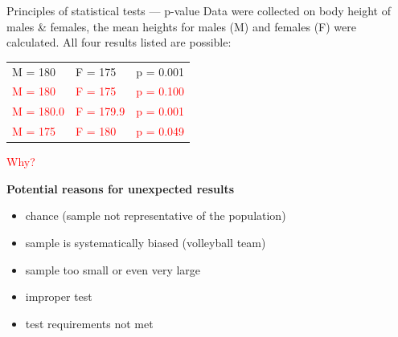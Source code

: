 \documentclass[
  ignorenonframetext,
  aspectratio=169,
  t]{beamer}
\providecommand{\tightlist}{%
  \setlength{\itemsep}{0pt}\setlength{\parskip}{0pt}}
\newcommand{\bluebold}[1]{\textcolor{bluebeamer}{\textbf{#1}}}
\begin{document}
\begin{frame}{Principles of statistical tests --- p-value}
\protect{}\label{principles-of-statistical-tests-p-value-1}
Data were collected on body height of males \& females, the mean heights
for males (M) and females (F) were calculated. All four results listed
are possible:

\begin{center}
\begin{tabular}{lll}
M = 180 & F = 175 & p = 0.001 \\
\textcolor{red}{M = 180} & \textcolor{red}{F = 175} & \textcolor{red}{p = 0.100} \\
\textcolor{red}{M = 180.0} & \textcolor{red}{F = 179.9} & \textcolor{red}{p = 0.001} \\
\textcolor{red}{M = 175} & \textcolor{red}{F = 180} & \textcolor{red}{p = 0.049} \\
\end{tabular}
\end{center}

\textcolor{red}{Why?}

\pause

\bluebold{Potential reasons for unexpected results}

\begin{itemize}
\tightlist
\item
  chance (sample not representative of the population)
\item
  sample is systematically biased (volleyball team)
\item
  sample too small or even very large
\item
  improper test
\item
  test requirements not met
\end{itemize}
\end{frame}
\end{document}
